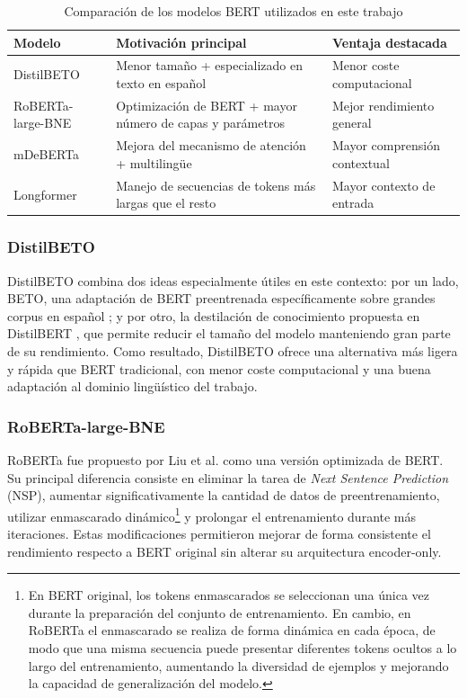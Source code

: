 \begin{table}[H]
	\centering
	\caption{Comparación de los modelos BERT utilizados en este trabajo}
	\label{tab:bert_models_comparison}
	\begin{tabular}{|p{4cm}|p{5cm}|p{5cm}|}
		\hline
		\textbf{Modelo} & \textbf{Motivación principal} & \textbf{Ventaja destacada} \\ \hline
		\acs{DistilBETO} & Menor tamaño + especializado en texto en español & Menor coste computacional \\ \hline
		RoBERTa-large-BNE & Optimización de BERT + mayor número de capas y parámetros & Mejor rendimiento general \\ \hline
		\acs{mDeBERTa} & Mejora del mecanismo de atención + multilingüe & Mayor comprensión contextual \\ \hline
		Longformer & Manejo de secuencias de tokens más largas que el resto & Mayor contexto de entrada \\ \hline
	\end{tabular}
\end{table}

\subsubsection{DistilBETO}

\ac{DistilBETO} combina dos ideas especialmente útiles en este contexto: por un lado, BETO, una adaptación de \ac{BERT} preentrenada específicamente sobre grandes corpus en español \cite{canete_spanish_2023}; y por otro, la destilación de conocimiento propuesta en \ac{DistilBERT} \cite{sanh_distilbert_2020}, que permite reducir el tamaño del modelo manteniendo gran parte de su rendimiento. Como resultado, \ac{DistilBETO} ofrece una alternativa más ligera y rápida que \ac{BERT} tradicional, con menor coste computacional y una buena adaptación al dominio lingüístico del trabajo.

\subsubsection{RoBERTa-large-BNE}

\acf{RoBERTa} fue propuesto por Liu et al. \cite{liu_roberta_2019} como una versión optimizada de \ac{BERT}. Su principal diferencia consiste en eliminar la tarea de \textit{Next Sentence Prediction} (NSP), aumentar significativamente la cantidad de datos de preentrenamiento, utilizar enmascarado dinámico\footnote{En \ac{BERT} original, los tokens enmascarados se seleccionan una única vez durante la preparación del conjunto de entrenamiento. En cambio, en \ac{RoBERTa} el enmascarado se realiza de forma dinámica en cada época, de modo que una misma secuencia puede presentar diferentes tokens ocultos a lo largo del entrenamiento, aumentando la diversidad de ejemplos y mejorando la capacidad de generalización del modelo.} y prolongar el entrenamiento durante más iteraciones. Estas modificaciones permitieron mejorar de forma consistente el rendimiento respecto a \ac{BERT} original sin alterar su arquitectura encoder-only.

